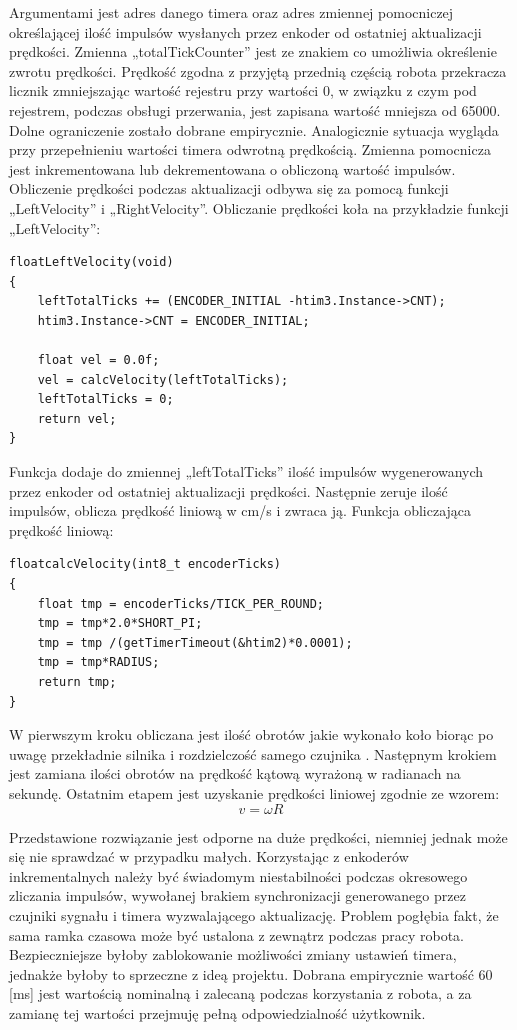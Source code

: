 \documentclass[eng,printmode]{mgr}
\begin{document}
Argumentami jest adres danego timera oraz adres zmiennej pomocniczej określającej ilość impulsów wysłanych przez enkoder od ostatniej aktualizacji prędkości. Zmienna „totalTickCounter” jest ze znakiem co umożliwia określenie zwrotu prędkości. Prędkość zgodna z przyjętą przednią częścią robota przekracza licznik zmniejszając wartość rejestru przy wartości 0, w związku z czym pod rejestrem, podczas obsługi przerwania,  jest zapisana wartość mniejsza od 65000. Dolne ograniczenie zostało dobrane empirycznie. Analogicznie sytuacja wygląda przy przepełnieniu wartości timera odwrotną prędkością. Zmienna pomocnicza jest inkrementowana lub dekrementowana o obliczoną wartość impulsów.
\\Obliczenie prędkości podczas aktualizacji odbywa się za pomocą funkcji „LeftVelocity” i „RightVelocity”. Obliczanie prędkości koła na przykładzie funkcji „LeftVelocity”:
\begin{lstlisting}[style=c]
floatLeftVelocity(void)
{
	leftTotalTicks += (ENCODER_INITIAL -htim3.Instance->CNT);
	htim3.Instance->CNT = ENCODER_INITIAL;

	float vel = 0.0f;
	vel = calcVelocity(leftTotalTicks);
	leftTotalTicks = 0;
	return vel;
}

\end{lstlisting}

Funkcja dodaje do zmiennej „leftTotalTicks” ilość impulsów wygenerowanych przez enkoder od ostatniej aktualizacji prędkości. Następnie zeruje ilość impulsów, oblicza prędkość liniową w cm/s i zwraca ją. Funkcja obliczająca prędkość liniową:
\begin{lstlisting}[style=c]
floatcalcVelocity(int8_t encoderTicks)
{
	float tmp = encoderTicks/TICK_PER_ROUND;
	tmp = tmp*2.0*SHORT_PI;
	tmp = tmp /(getTimerTimeout(&htim2)*0.0001);
	tmp = tmp*RADIUS;
	return tmp;
}

\end{lstlisting}

W pierwszym kroku obliczana jest ilość obrotów jakie wykonało koło biorąc po uwagę przekładnie silnika i rozdzielczość samego czujnika . Następnym krokiem jest zamiana ilości obrotów na prędkość kątową wyrażoną w radianach na sekundę. Ostatnim etapem jest uzyskanie prędkości liniowej zgodnie ze wzorem:
\begin{equation}\label{eq:aproksymacja}
   v = \omega R
  \end{equation}

Przedstawione rozwiązanie jest odporne na duże prędkości,  niemniej jednak może się nie sprawdzać w przypadku małych. Korzystając z enkoderów inkrementalnych należy być świadomym niestabilności podczas okresowego zliczania impulsów, wywołanej brakiem synchronizacji generowanego przez czujniki sygnału i timera wyzwalającego aktualizację. Problem pogłębia fakt, że sama ramka czasowa może być ustalona z zewnątrz podczas pracy robota. Bezpieczniejsze byłoby zablokowanie możliwości zmiany ustawień timera, jednakże byłoby to sprzeczne z ideą projektu. Dobrana empirycznie wartość 60 [ms] jest wartością nominalną i zalecaną podczas korzystania z robota, a za zamianę tej wartości przejmuję pełną odpowiedzialność użytkownik. 
\end{document}
